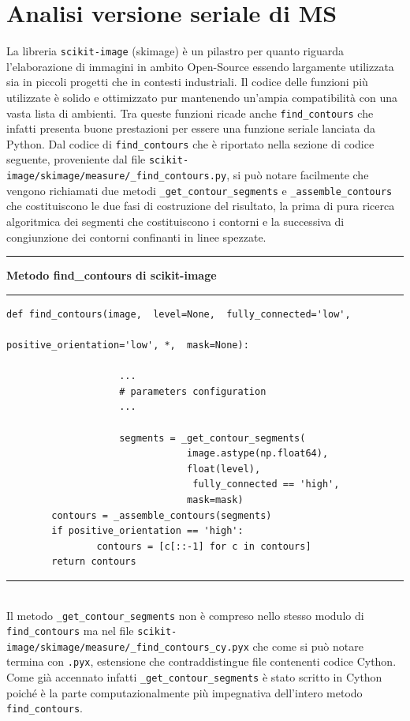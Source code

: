\documentclass[12pt,a4paper]{report}
\begin{document}
\section{Analisi versione seriale di MS}
La libreria \verb|scikit-image| (skimage) è un pilastro per quanto riguarda l'elaborazione di immagini in ambito Open-Source essendo largamente utilizzata sia in piccoli progetti che in contesti industriali.  Il codice delle funzioni più utilizzate è solido e ottimizzato pur mantenendo un'ampia compatibilità con una vasta lista di ambienti. 
Tra queste funzioni ricade anche \verb|find_contours| che infatti presenta buone prestazioni per essere una funzione seriale lanciata da Python.\newline
Dal codice di \verb|find_contours| che è riportato nella sezione di codice seguente, proveniente dal file \verb|scikit-image/skimage/measure/_find_contours.py|, si può notare facilmente che vengono richiamati due metodi \verb|_get_contour_segments| e \verb|_assemble_contours| che costituiscono le due fasi di costruzione del risultato, la prima di pura ricerca algoritmica dei segmenti che costituiscono i contorni e la successiva di congiunzione dei contorni confinanti in linee spezzate. \\[10pt]
\noindent\rule[0.5ex]{\linewidth}{2pt}
\small{\textbf{Metodo find\_contours di scikit-image}} \\
\noindent\rule[0.5ex]{\linewidth}{1pt}
\begin{lstlisting}
def find_contours(image,  level=None,  fully_connected='low', 
																		positive_orientation='low', *,  mask=None):

					...
					# parameters configuration
					...	

					segments = _get_contour_segments(
					 			image.astype(np.float64), 
					 			float(level),
								 fully_connected == 'high', 
					 			mask=mask)
    	contours = _assemble_contours(segments)
    	if positive_orientation == 'high':
        		contours = [c[::-1] for c in contours]
    	return contours
\end{lstlisting}
\noindent\rule[0.5ex]{\linewidth}{1pt} \\[10pt]
Il metodo \verb|_get_contour_segments| non è compreso nello stesso modulo di \verb|find_contours| ma nel file \verb|scikit-image/skimage/measure/_find_contours_cy.pyx| che come si può notare termina con \verb|.pyx|, estensione che contraddistingue file contenenti codice Cython.  Come già accennato infatti \verb|_get_contour_segments| è stato scritto in Cython poiché è la parte computazionalmente più impegnativa dell'intero metodo \verb|find_contours|.  \newline
\end{document}
